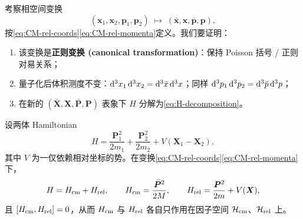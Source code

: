 考察相空间变换
\begin{equation}
  (\bm{x}_1,\bm{x}_2,\bm{p}_1,\bm{p}_2) \;\longmapsto\; (\bar{\bm{x}},\bm{x},\bar{\bm{p}},\bm{p}),
  \label{eq:2P-canonical-map}
\end{equation}
按\eqref{eq:CM-rel-coords}\eqref{eq:CM-rel-momenta}定义。我们要证明：
\begin{enumerate}
  \item 该变换是\textbf{正则变换 (canonical transformation)}：保持 Poisson 括号 / 正则对易关系；
  \item 量子化后体积测度不变：$\mathrm{d}^3 x_1\,\mathrm{d}^3 x_2 = \mathrm{d}^3\bar{x}\,\mathrm{d}^3 x$；同样 $\mathrm{d}^3 p_1\,\mathrm{d}^3 p_2 = \mathrm{d}^3\bar{p}\,\mathrm{d}^3 p$；
  \item 在新的 $(\bar{\bm{X}},\bm{X},\bar{\bm{P}},\bm{P})$ 表象下 $H$ 分解为\eqref{eq:H-decomposition}。
\end{enumerate}

\begin{theorem}[质心–相对分解]\label{thm:2P-cm-rel-decomp}
  设两体 Hamiltonian
  \[
    H = \frac{\bm{P}_1^2}{2m_1} + \frac{\bm{P}_2^2}{2m_2} + V(\bm{X}_1-\bm{X}_2),
  \]
  其中 $V$ 为一仅依赖相对坐标的势。在变换\eqref{eq:CM-rel-coords}\eqref{eq:CM-rel-momenta}下，
  \begin{equation}
    H = H_{\rm cm} + H_{\rm rel},\qquad
    H_{\rm cm} = \frac{\bar{\bm{P}}^2}{2M},\qquad
    H_{\rm rel} = \frac{\bm{P}^2}{2m} + V(\bm{X}),
    \label{eq:2P-H-decomp-thm}
  \end{equation}
  且 $[H_{\rm cm},H_{\rm rel}]=0$，从而 $H_{\rm cm}$ 与 $H_{\rm rel}$ 各自只作用在因子空间 $\mathcal{H}_{\rm cm}$、$\mathcal{H}_{\rm rel}$ 上。
\end{theorem}

